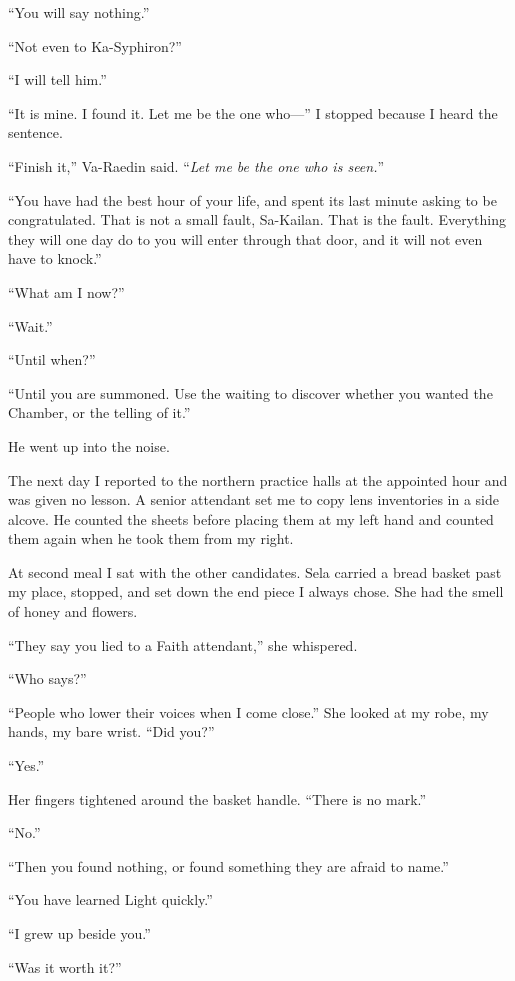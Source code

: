 ``You will say nothing.''\par
``Not even to Ka-Syphiron?''\par
``I will tell him.''\par
``It is mine. I found it. Let me be the one who---'' I stopped because I heard the sentence.\par
``Finish it,'' Va-Raedin said. ``\textit{Let me be the one who is seen.}''\par
``You have had the best hour of your life, and spent its last minute asking to be congratulated. That is not a small fault, Sa-Kailan. That is the fault. Everything they will one day do to you will enter through that door, and it will not even have to knock.''\par
``What am I now?''\par
``Wait.''\par
``Until when?''\par
``Until you are summoned. Use the waiting to discover whether you wanted the Chamber, or the telling of it.''\par

He went up into the noise.\par

\ornament

The next day I reported to the northern practice halls at the appointed hour and was given no lesson. A senior attendant set me to copy lens inventories in a side alcove. He counted the sheets before placing them at my left hand and counted them again when he took them from my right.\par

At second meal I sat with the other candidates. Sela carried a bread basket past my place, stopped, and set down the end piece I always chose. She had the smell of honey and flowers.\par

``They say you lied to a Faith attendant,'' she whispered.\par
``Who says?''\par
``People who lower their voices when I come close.'' She looked at my robe, my hands, my bare wrist. ``Did you?''\par
``Yes.''\par
Her fingers tightened around the basket handle. ``There is no mark.''\par
``No.''\par
``Then you found nothing, or found something they are afraid to name.''\par
``You have learned Light quickly.''\par
``I grew up beside you.''\par
``Was it worth it?''\par

